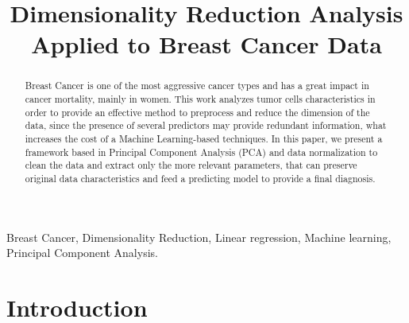 \documentclass[conference]{IEEEtran}
\begin{document}
\title{Dimensionality Reduction Analysis Applied to Breast Cancer Data}

\author{
\and
{}
}

\maketitle

\begin{abstract}
Breast Cancer is one of the most aggressive cancer types and has a great impact in cancer mortality, mainly in women. This work analyzes tumor cells characteristics in order to provide an effective method to preprocess and reduce the dimension of the data, since the presence of several predictors may provide redundant information, what increases the cost of a Machine Learning-based techniques. In this paper, we present a framework based in Principal Component Analysis (PCA) and data normalization to clean the data and extract only the more relevant parameters, that can preserve original data characteristics and feed a predicting model to provide a final diagnosis.

\end{abstract}

\begin{IEEEkeywords}
Breast Cancer, Dimensionality Reduction, Linear regression, Machine learning, Principal Component Analysis.
\end{IEEEkeywords}

\section{Introduction}
\end{document}
